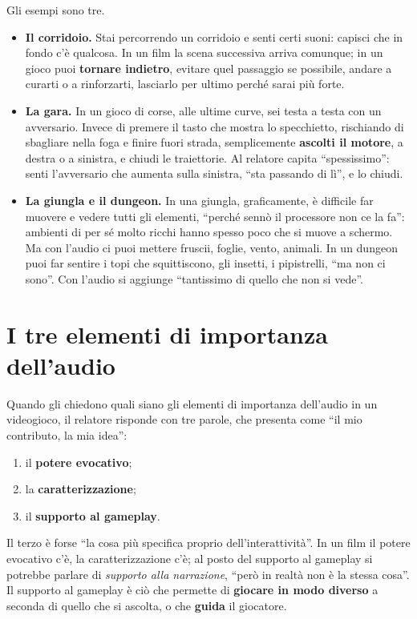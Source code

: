 Gli esempi sono tre.
\begin{itemize}
  \item \textbf{Il corridoio.} Stai percorrendo un corridoio e senti certi suoni:
        capisci che in fondo c'è qualcosa. In un film la scena successiva arriva
        comunque; in un gioco puoi \textbf{tornare indietro}, evitare quel
        passaggio se possibile, andare a curarti o a rinforzarti, lasciarlo per
        ultimo perché sarai più forte.
  \item \textbf{La gara.} In un gioco di corse, alle ultime curve, sei testa a
        testa con un avversario. Invece di premere il tasto che mostra lo
        specchietto, rischiando di sbagliare nella foga e finire fuori strada,
        semplicemente \textbf{ascolti il motore}, a destra o a sinistra, e chiudi
        le traiettorie. Al relatore capita ``spessissimo'': senti l'avversario
        che aumenta sulla sinistra, ``sta passando di lì'', e lo chiudi.
  \item \textbf{La giungla e il dungeon.} In una giungla, graficamente, è
        difficile far muovere e vedere tutti gli elementi, ``perché sennò il
        processore non ce la fa'': ambienti di per sé molto ricchi hanno spesso
        poco che si muove a schermo. Ma con l'audio ci puoi mettere fruscii,
        foglie, vento, animali. In un dungeon puoi far sentire i topi che
        squittiscono, gli insetti, i pipistrelli, ``ma non ci sono''. Con l'audio
        si aggiunge ``tantissimo di quello che non si vede''.
\end{itemize}

\section{I tre elementi di importanza dell'audio}
\label{z9:sec:tre}

Quando gli chiedono quali siano gli elementi di importanza dell'audio in un
videogioco, il relatore risponde con tre parole, che presenta come ``il mio
contributo, la mia idea'':
\begin{enumerate}
  \item il \textbf{potere evocativo};
  \item la \textbf{caratterizzazione};
  \item il \textbf{supporto al gameplay}.
\end{enumerate}

Il terzo è forse ``la cosa più specifica proprio dell'interattività''. In un film
il potere evocativo c'è, la caratterizzazione c'è; al posto del supporto al
gameplay si potrebbe parlare di \emph{supporto alla narrazione}, ``però in realtà
non è la stessa cosa''. Il supporto al gameplay è ciò che permette di
\textbf{giocare in modo diverso} a seconda di quello che si ascolta, o che
\textbf{guida} il giocatore.

